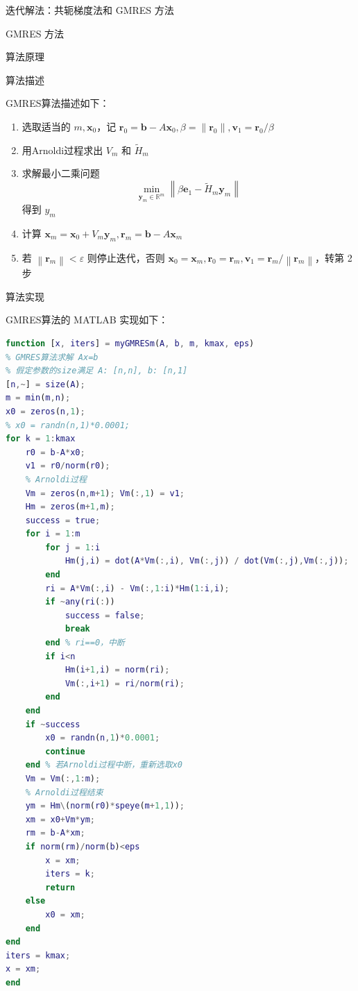 \documentclass[a4paper]{article}
\begin{document}
\begin{multicols}{2}
\begin{section}{迭代解法：共轭梯度法和 GMRES 方法}
\begin{subsection}{GMRES 方法}
\begin{subsubsection}{算法原理}
		\end{subsubsection}
		
		\begin{subsubsection}{算法描述}
		
			GMRES算法描述如下：
			
			\begin{enumerate}
			  \item 选取适当的 $m, \mathbf{x}_0$，记 $\mathbf{r}_0 = \mathbf{b}-A\mathbf{x}_0, \beta = \|\mathbf{r}_0\|, \mathbf{v}_1 = \mathbf{r}_0/\beta$
			  \item 用Arnoldi过程求出 $V_m$ 和 $\widetilde{H}_{m}$
			  \item 求解最小二乘问题 $$\min _{\mathbf{y}_{m} \in \mathbb{R}^{m}}\left\|\beta \mathbf{e}_{1}-\widetilde{H}_{m} \mathbf{y}_{m}\right\|$$ 得到 $y_m$
			  \item 计算 $\mathbf{x}_{m}=\mathbf{x}_{0}+V_{m} \mathbf{y}_{m}, \mathbf{r}_{m}=\mathbf{b}-A \mathbf{x}_{m}$
			  \item 若 $\left\|\mathbf{r}_{m}\right\|<\varepsilon$ 则停止迭代，否则 $\mathbf{x}_{0}=\mathbf{x}_{m}, \mathbf{r}_{0}=\mathbf{r}_{m}, \mathbf{v}_{1}=\mathbf{r}_{m} /\left\|\mathbf{r}_{m}\right\|$，转第 2 步
			\end{enumerate}
		
		\end{subsubsection}
	
		\begin{subsubsection}{算法实现}
		
			GMRES算法的 MATLAB 实现如下：
			
			\begin{lstlisting}[language=Matlab]
function [x, iters] = myGMRESm(A, b, m, kmax, eps)
% GMRES算法求解 Ax=b
% 假定参数的size满足 A: [n,n], b: [n,1]
[n,~] = size(A);
m = min(m,n);
x0 = zeros(n,1);
% x0 = randn(n,1)*0.0001;
for k = 1:kmax
    r0 = b-A*x0;
    v1 = r0/norm(r0);
    % Arnoldi过程
    Vm = zeros(n,m+1); Vm(:,1) = v1;
    Hm = zeros(m+1,m);
    success = true;
    for i = 1:m
        for j = 1:i
            Hm(j,i) = dot(A*Vm(:,i), Vm(:,j)) / dot(Vm(:,j),Vm(:,j));
        end
        ri = A*Vm(:,i) - Vm(:,1:i)*Hm(1:i,i);
        if ~any(ri(:)) 
            success = false;
            break
        end % ri==0，中断
        if i<n
            Hm(i+1,i) = norm(ri);
            Vm(:,i+1) = ri/norm(ri);
        end
    end
    if ~success 
        x0 = randn(n,1)*0.0001;
        continue
    end % 若Arnoldi过程中断，重新选取x0
    Vm = Vm(:,1:m);
    % Arnoldi过程结束
    ym = Hm\(norm(r0)*speye(m+1,1));
    xm = x0+Vm*ym;
    rm = b-A*xm;    
    if norm(rm)/norm(b)<eps
        x = xm;
        iters = k;
        return
    else
        x0 = xm;
    end
end
iters = kmax;
x = xm;
end
			\end{lstlisting}
		

\end{subsubsection}
\end{subsection}
\end{section}
\end{multicols}
\end{document}
